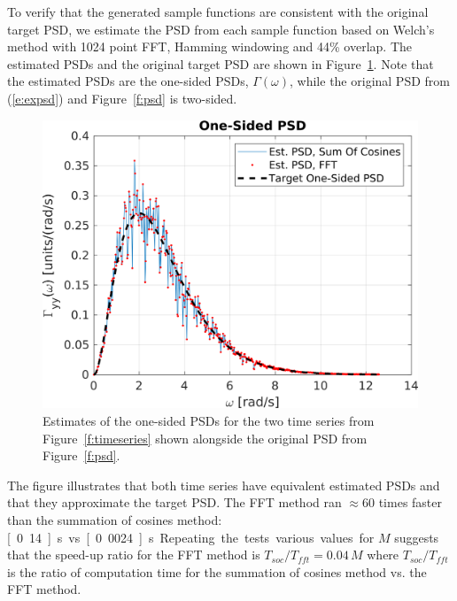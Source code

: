 \documentclass[11pt]{article}
\begin{document}
To verify that the generated sample functions are consistent with the original target PSD, we estimate the PSD from each sample function based on Welch's method with 1024 point FFT, Hamming windowing and 44\% overlap.  The estimated PSDs and the original target PSD are shown in Figure~\ref{f:psdest}.  Note that the estimated PSDs are the one-sided PSDs, $\Gamma(\omega)$, while the original PSD from (\ref{e:expsd}) and Figure~\ref{f:psd} is two-sided.
\begin{figure}[hbt!]
  \centering
  \includegraphics[width=\FigWidth\textwidth]{images/psdest.png}
  \caption{Estimates of the one-sided PSDs for the two time series from Figure~\ref{f:timeseries} shown alongside the original PSD from Figure~\ref{f:psd}. }
  \label{f:psdest}
\end{figure}
The figure illustrates that both time series have equivalent estimated PSDs and that they approximate the target PSD.  The FFT method ran $\approx 60$ times faster than the summation of cosines method: \unit[0.14]{s} vs. \unit[0.0024]{s}.  Repeating the tests various values for $M$ suggests that the speed-up ratio for the FFT method is $T_{soc}/T_{fft} = 0.04 \, M$ where $T_{soc}/T_{fft}$ is the ratio of computation time for the summation of cosines method vs. the FFT method.


\newpage
\setcounter{page}{1}
%


%
\end{document}
